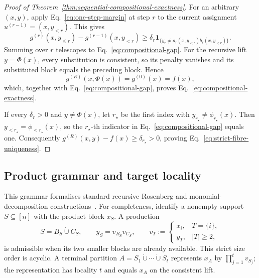 \documentclass[a4paper,onecolumn,11pt,unpublished]{quantumarticle}
\theoremstyle{remark}
\begin{document}
\begin{proof}[Proof of Theorem~\ref{thm:sequential-compositional-exactness}]
For an arbitrary \((x,y)\), apply
Eq.~\eqref{eq:one-step-margin} at step \(r\) to the current assignment
\(u^{(r-1)}=(x,y_{<r})\).  This gives
\begin{equation}
  g^{(r)}(x,y_{\leq r})-g^{(r-1)}(x,y_{<r})
  \geq\delta_r
  \mathbf 1_{\{y_r\neq
  a_r(x,y_{<r})b_r(x,y_{<r})\}}.
  \label{eq:stepwise-compositional-gap}
\end{equation}
Summing over \(r\) telescopes to Eq.~\eqref{eq:compositional-gap}.  For the
recursive lift \(y=\Phi(x)\), every substitution is consistent, so its
penalty vanishes and its substituted block equals the preceding block.
Hence
\begin{equation}
  g^{(R)}(x,\Phi(x))=g^{(0)}(x)=f(x),
\end{equation}
which, together with Eq.~\eqref{eq:compositional-gap}, proves
Eq.~\eqref{eq:compositional-exactness}.

If every \(\delta_r>0\) and \(y\neq\Phi(x)\), let \(r_\star\) be the first
index with \(y_{r_\star}\neq\phi_{r_\star}(x)\).  Then
\(y_{<r_\star}=\phi_{<r_\star}(x)\), so the \(r_\star\)-th indicator in
Eq.~\eqref{eq:compositional-gap} equals one.  Consequently
\(g^{(R)}(x,y)-f(x)\geq\delta_{r_\star}>0\), proving
Eq.~\eqref{eq:strict-fibre-uniqueness}.
\end{proof}

\subsection{Product grammar and target locality}
\label{app:product-grammar}
\label{app:target-locality-proof}

This grammar formalises standard recursive Rosenberg and monomial-decomposition
constructions~\cite{Rosenberg1975,BorosGruber2014,CramaEtAl2025}.
For completeness, identify a nonempty support \(S\subseteq[n]\) with the
product block \(x_S\).  A production
\begin{equation}
  S=B_S\mathbin{\dot\cup}C_S,
  \qquad
  y_S=v_{B_S}v_{C_S},
  \qquad
  v_T:=
  \begin{cases}
    x_i,&T=\{i\},\\
    y_T,&|T|\geq2,
  \end{cases}
  \label{eq:product-grammar-production}
\end{equation}
is admissible when its two smaller blocks are already available.  This
strict size order is acyclic.  A terminal partition
\(A=S_1\mathbin{\dot\cup}\cdots\mathbin{\dot\cup}S_t\) represents
\(x_A\) by \(\prod_{j=1}^t v_{S_j}\); the representation has locality
\(t\) and equals \(x_A\) on the consistent lift.
\end{document}
